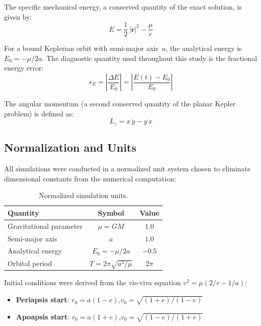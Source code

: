 \documentclass[twocolumn, 10pt]{article}
\begin{document}
The specific mechanical energy, a conserved quantity of the exact solution, is given by:
\begin{equation}
E = \frac{1}{2}\,|\dot{\mathbf{r}}|^2 - \frac{\mu}{r}
\label{eq:energy}
\end{equation}

For a bound Keplerian orbit with semi-major axis~$a$, the analytical energy is $E_0 = -\mu / 2a$. The diagnostic quantity used throughout this study is the fractional energy error:
\begin{equation}
\epsilon_E = \left| \frac{\Delta E}{E_0} \right| = \left| \frac{E(t) - E_0}{E_0} \right|
\label{eq:frac_error}
\end{equation}

The angular momentum (a second conserved quantity of the planar Kepler problem) is defined as:
\begin{equation}
L_z = x\,\dot{y} - y\,\dot{x}
\label{eq:angmom}
\end{equation}

\subsection{Normalization and Units}

All simulations were conducted in a normalized unit system chosen to eliminate dimensional constants from the numerical computation:

\begin{table}[H]
\centering
\caption{Normalized simulation units.}
\label{tab:units}
\begin{tabular}{@{}lcc@{}}
\toprule
Quantity & Symbol & Value \\
\midrule
Gravitational parameter & $\mu = GM$ & $1.0$ \\
Semi-major axis & $a$ & $1.0$ \\
Analytical energy & $E_0 = -\mu/2a$ & $-0.5$ \\
Orbital period & $T = 2\pi\sqrt{a^3/\mu}$ & $2\pi$ \\
\bottomrule
\end{tabular}
\end{table}

Initial conditions were derived from the vis-viva equation $v^2 = \mu(2/r - 1/a)$:
\begin{itemize}[nosep]
    \item \textbf{Periapsis start}: $r_0 = a(1 - e)$,\quad $v_0 = \sqrt{(1 + e)/(1 - e)}$
    \item \textbf{Apoapsis start}: $r_0 = a(1 + e)$,\quad $v_0 = \sqrt{(1 - e)/(1 + e)}$
\end{itemize}
\end{document}
